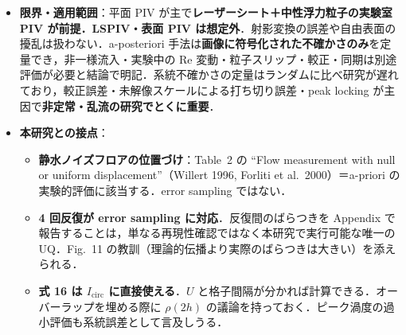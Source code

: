 \documentclass[11pt]{jsarticle}
\begin{document}
\begin{itemize}
\begin{itemize}
    \item \textbf{渦度の不確かさ（式 16）}：$U_\omega = (U/h)\sqrt{1 - \rho(2h)}$．$U$ は速度の局所標準不確かさ，$h$ は格子間隔，$\rho(2h)$ は距離 $2h$ の 2 点における\textbf{計測誤差の相互相関係数}．誤差が空間相関しているほど渦度の不確かさは下がる．報告値は $32 \times 32$ 窓で\textbf{オーバーラップ 75~\% なら $\rho = 0.45$，50~\% 以下では $\rho = 0$}．＝オーバーラップの選択が微分量の不確かさに効く．関連して Luff 1999：渦度の不確かさが最小になるのは標準的な 3 点中心差分＋局所多項式回帰・ガウシアン平滑化の併用．Fouras \& Soria 1998：空間サンプリング間隔を広げるとバイアスが増え\textbf{ピーク渦度を過小評価する}．
    \item \textbf{統計量}（§5.1）：平均値の不確かさには有効サンプル数 $N_\mathrm{eff}$ を使うべき．time-resolved PIV では取得周波数が高くサンプル間に時間相関があり $N_\mathrm{eff} \ll N$ になる．バイアス不確かさの推定は困難で「現時点では uncertainty surface 法のみが直接アクセスを提供する」．
    \item \textbf{推奨}：有限窓による空間変調の系統不確かさを定量するには，異なる検査窓サイズで処理して結果のばらつきを報告せよ（§5.1 末尾）．
  \end{itemize}
  \item \textbf{限界・適用範囲}：平面 PIV が主で\textbf{レーザーシート＋中性浮力粒子の実験室 PIV が前提．LSPIV・表面 PIV は想定外}．射影変換の誤差や自由表面の擾乱は扱わない．a-posteriori 手法は\textbf{画像に符号化された不確かさのみ}を定量でき，非一様流入・実験中の Re 変動・粒子スリップ・較正・同期は別途評価が必要と結論で明記．系統不確かさの定量はランダムに比べ研究が遅れており，較正誤差・未解像スケールによる打ち切り誤差・peak locking が主因で\textbf{非定常・乱流の研究でとくに重要}．
  \item \textbf{本研究との接点}：
  \begin{itemize}
    \item \textbf{静水ノイズフロアの位置づけ}：Table~2 の ``Flow measurement with null or uniform displacement''（Willert 1996, Forliti et al.\ 2000）＝a-priori の実験的評価に該当する．error sampling ではない．
    \item \textbf{4 回反復が error sampling に対応}．反復間のばらつきを Appendix で報告することは，単なる再現性確認ではなく本研究で実行可能な唯一の UQ．Fig.~11 の教訓（理論的伝播より実際のばらつきは大きい）を添えられる．
    \item \textbf{式 16 は $I_\mathrm{circ}$ に直接使える}．$U$ と格子間隔が分かれば計算できる．オーバーラップを埋める際に $\rho(2h)$ の議論を持っておく．ピーク渦度の過小評価も系統誤差として言及しうる．

\end{itemize}
\end{itemize}
\end{document}
